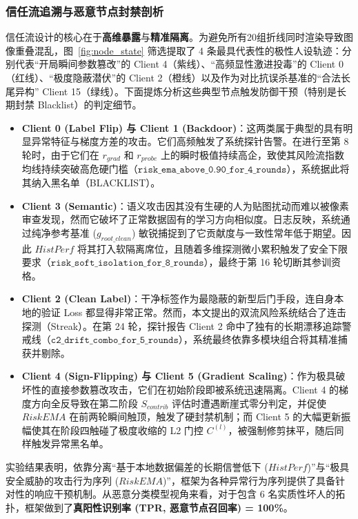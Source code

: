 \documentclass[runningheads]{llncs}
\begin{document}
\subsubsection{信任流追溯与恶意节点封禁剖析}
信任流设计的核心在于\textbf{高维暴露}与\textbf{精准隔离}。为避免所有20组折线同时渲染导致图像重叠混乱，图~\ref{fig:node_state} 筛选提取了 4 条最具代表性的极性人设轨迹：分别代表“开局瞬间参数篡改”的 Client 4（紫线）、“高频显性激进投毒”的 Client 0（红线）、“极度隐蔽潜伏”的 Client 2（橙线）以及作为对比抗误杀基准的“合法长尾异构” Client 15（绿线）。下面提炼分析这些典型节点触发防御干预（特别是长期封禁 Blacklist）的判定细节。
\begin{itemize}
    \item \textbf{Client 0 (Label Flip) 与 Client 1 (Backdoor)}：这两类属于典型的具有明显异常特征与梯度方差的攻击。它们高频触发了系统探针告警。在进行至第 8 轮时，由于它们在 $r_{grad}$ 和 $r_{probe}$ 上的瞬时极值持续高企，致使其风险流指数均线持续突破高危硬门槛（$\texttt{risk\_ema\_above\_0.90\_for\_4\_rounds}$），系统据此将其纳入黑名单（BLACKLIST）。
    \item \textbf{Client 3 (Semantic)}：语义攻击因其没有生硬的人为贴图扰动而难以被像素审查发现，然而它破坏了正常数据固有的学习方向相似度。日志反映，系统通过纯净参考基准 ($g_{root\_clean}$) 敏锐捕捉到了它贡献度与一致性常年低于期望。因此 $HistPerf$ 将其打入软隔离席位，且随着多维探测微小累积触发了安全下限要求（$\texttt{risk\_soft\_isolation\_for\_8\_rounds}$），最终于第 16 轮切断其参训资格。
    \item \textbf{Client 2 (Clean Label)}：干净标签作为最隐蔽的新型后门手段，连自身本地的验证 Loss 都显得非常正常。然而，本文提出的双流风险系统结合了连击探测（Streak）。在第 24 轮，探针报告 Client 2 命中了独有的长期漂移追踪警戒线（$\texttt{c2\_drift\_combo\_for\_5\_rounds}$），系统最终依靠多模块组合将其精准捕获并剔除。
    \item \textbf{Client 4 (Sign-Flipping) 与 Client 5 (Gradient Scaling)}：作为极具破坏性的直接参数篡改攻击，它们在初始阶段即被系统迅速隔离。Client 4 的梯度方向全反导致在第二阶段 $S_{contrib}$ 评估时遭遇断崖式零分判定，并促使 $RiskEMA$ 在前两轮瞬间触顶，触发了硬封禁机制；而 Client 5 的大幅更新振幅使其在阶段四触碰了极度收缩的 L2 门控 $C^{(l)}$，被强制修剪抹平，随后同样触发异常黑名单。
\end{itemize}
实验结果表明，依靠分离“基于本地数据偏差的长期信誉低下 ($HistPerf$)”与“极具安全威胁的攻击行为序列 ($RiskEMA$)”，框架为各种异常行为序列提供了具备针对性的响应干预机制。从恶意分类模型视角来看，对于包含 6 名实质性坏人的拓扑，框架做到了\textbf{真阳性识别率 (TPR, 恶意节点召回率) = 100\%}。
\end{document}
